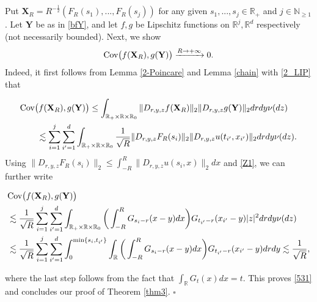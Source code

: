 \documentclass[letterpaper, 11pt,  reqno]{amsart}
\newcommand{\noi}{\noindent}
\newcommand{\R}{\mathbb{R}}
\newcommand{\les}{\lesssim}
\newcommand{\N}{\mathbb{N}}
\numberwithin{equation}{section}
\numberwithin{theorem}{section}
\begin{document}
Put $\mathbf X_R= R^{-\frac12}  (  F_R(s_1), ... ,    F_R(s_j)   )$
for any given $s_1, ..., s_j\in\R_+$ and $j\in\N_{\geq 1}$. Let $\mathbf{Y}$ be as in \eqref{bfY},
and let $f, g$ be  Lipschitz functions on $\R^j, \R^d$ respectively (not necessarily bounded). 
Next, we show
\begin{align}\label{531}
\text{\rm Cov}\big( f(\mathbf{X}_R), g(\mathbf{Y})  \big) \xrightarrow{R\to+\infty} 0.
\end{align}
Indeed, it  first 
follows from Lemma \ref{2-Poincare} and Lemma \ref{chain} with \eqref{2_LIP}
that 





\noi
\begin{align*}
&\text{\rm Cov}\big( f(\mathbf{X}_R), g(\mathbf{Y})  \big) 
\leq \int_{\R_+\times\R\times\R_0}  \| D_{r, y, z}  f(\mathbf{X}_R)  \|_2
\| D_{r, y, z}  g(\mathbf{Y})  \|_2 drdy \nu(dz) \\
& \qquad  \les  \sum_{i=1}^j  \sum_{i'=1}^d  \int_{\R_+\times\R\times\R_0} \frac{1}{\sqrt{R}} \| D_{r, y, z} F_R(s_i)  \|_2
\| D_{r, y, z} u(t_{i'}, x_{i'})   \|_2 drdy \nu(dz).
\end{align*}
Using $ \| D_{r, y, z} F_R(s_i)  \|_2 \leq \int_{-R}^R   \| D_{r, y, z}  u(s_i, x)  \|_2 dx$
and \eqref{Z1}, we can further write 

\noi
\begin{align*}
&\text{\rm Cov}\big( f(\mathbf{X}_R), g(\mathbf{Y})  \big)   \\
&  \les  \frac{1}{\sqrt{R}}   \sum_{i=1}^j  \sum_{i'=1}^d  
 \int_{\R_+\times\R\times\R_0} \bigg( \int_{-R}^R
 G_{s_i - r}(x-y) dx \bigg) G_{t_{i'} -r }( x_{i'} -y) |z|^2  drdy \nu(dz) \\
 & \les  \frac{1}{\sqrt{R}}   \sum_{i=1}^j  \sum_{i'=1}^d  
 \int_0^{ \min\{ s_i, t_{i'} \}  }\int_{\R} \bigg( \int_{-R}^R
 G_{s_i - r}(x-y)dx \bigg) G_{t_{i'} -r }( x_{i'} -y)  drdy  
  \les  \frac{1}{\sqrt{R}}, 
\end{align*}

\noi
where the last step follows from the fact that  $\int_\R G_t(x)dx = t$.
This proves \eqref{531}
and concludes our proof of Theorem \ref{thm3}.
 \hfill $\square$
\end{document}
